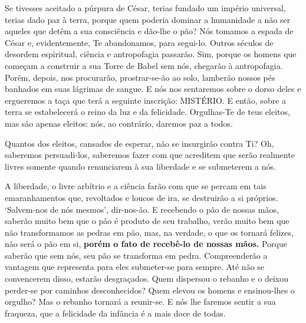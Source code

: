 Se tivesses aceitado a púrpura de César, terias fundado um império
universal, terias dado paz à terra, porque quem poderia dominar a
humanidade a não ser aqueles que detêm a sua consciência e dão-lhe o
pão? Nós tomamos a espada de César e, evidentemente, Te abandonamos,
para segui-lo. Outros séculos de desordem espiritual, ciência e
antropofagia passarão. Sim, porque os homens que começam a construir a
sua Torre de Babel sem nós, chegarão à antropofagia. Porém, depois, nos
procurarão, prostrar-se-ão ao solo, lamberão nossos pés banhados em suas
lágrimas de sangue. E nós nos sentaremos sobre o dorso deles e
ergueremos a taça que terá a seguinte inscrição: MISTÉRIO. E então,
sobre a terra se estabelecerá o reino da luz e da felicidade.
Orgulhas-Te de teus eleitos, mas são apenas eleitos: nós, ao contrário,
daremos paz a todos.

Quantos dos eleitos, cansados de esperar, não se insurgirão contra Ti?
Oh, saberemos persuadi-los, saberemos fazer com que acreditem que serão
realmente livres somente quando renunciarem à sua liberdade e se
submeterem a nós.

A liberdade, o livre arbítrio e a ciência farão com que se percam em
tais emaranhamentos que, revoltados e loucos de ira, se destruirão a si
próprios. `Salvem-nos de nós mesmos', dir-nos-ão. E recebendo o pão de
nossas mãos, saberão muito bem que o pão é produto de seu trabalho,
verão muito bem que não transformamos as pedras em pão, mas, na verdade,
o que os tornará felizes, não será o pão em si, \textbf{porém o fato de
recebê-lo de nossas mãos.} Porque saberão que sem nós, seu pão se
transforma em pedra. Compreenderão a vantagem que representa para eles
submeter-se para sempre. Até não se convencerem disso, estarão
desgraçados. Quem dispersou o rebanho e o deixou perder-se por caminhos
desconhecidos? Quem elevou os homens e ensinou-lhes o orgulho? Mas o
rebanho tornará a reunir-se. E nós lhe faremos sentir a sua fraqueza,
que a felicidade da infância é a mais doce de todas.

